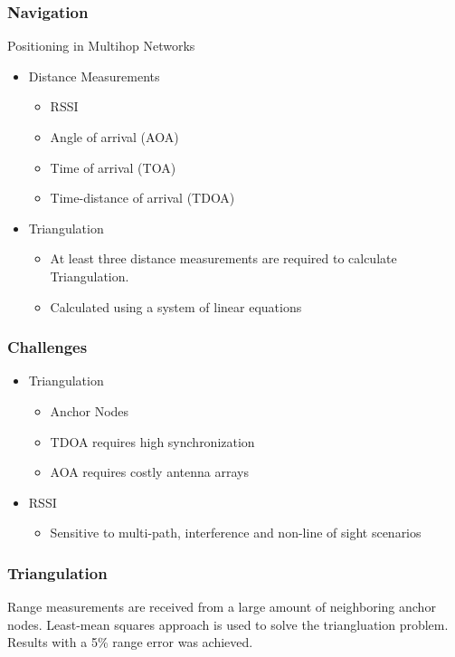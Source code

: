     

\begin{frame}[t]
  \frametitle{Navigation}
  
  Positioning in Multihop Networks
  \begin{itemize}
  \item Distance Measurements
    \begin{itemize}
    \item RSSI
    \item Angle of arrival (AOA)
    \item Time of arrival (TOA)
    \item Time-distance of arrival (TDOA)
    \end{itemize}
  \item Triangulation
    \begin{itemize}
      \item At least three distance measurements are required to calculate
        Triangulation.
      \item Calculated using a system of linear equations
    \end{itemize}
  \end{itemize}

  \vfill

\end{frame}

\begin{frame}[t]
  \frametitle{Challenges}

  \begin{itemize}
  \item Triangulation
    \begin{itemize}
    \item Anchor Nodes
    \item TDOA requires high synchronization
    \item AOA requires costly antenna arrays
    \end{itemize}
  \item RSSI
    \begin{itemize}
      \item Sensitive to multi-path, interference and non-line of sight
        scenarios
    \end{itemize}
  \end{itemize}

  \vfill

\end{frame}

\begin{frame}[t]
  \frametitle{Triangulation}

  \vfill
  Range measurements are received from a large amount of neighboring anchor
  nodes.
  \vfill
  Least-mean squares approach is used to solve the triangluation problem.
  \vfill
  Results with a 5\% range error was achieved.

  \vfill

\end{frame}

